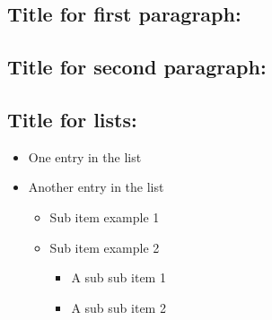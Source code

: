 \documentclass[12pt]{article} %
\begin{document}
\begin{flushleft}
\section*{Title for first paragraph:}
\lipsum[1]
\end{flushleft}


\begin{flushleft}
\section*{Title for second paragraph:}
\lipsum[1]
\end{flushleft}


\newpage


\begin{flushleft}
\section*{Title for lists:}
\begin{itemize}
  \item One entry in the list
  \item Another entry in the list
  \begin{itemize}
  \item Sub item example 1
  \item Sub item example 2
  \begin{itemize}
  \item A sub sub item 1
  \item A sub sub item 2
  \end{itemize}
  \end{itemize}
\end{itemize}
\end{flushleft}


\newpage


\end{document}
